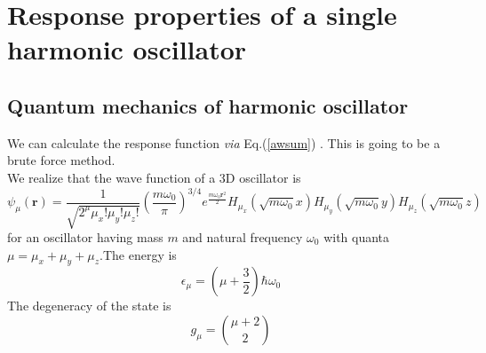 \documentclass{article}
\newcommand{\eq}{\begin{equation}}
\newcommand{\qe}{\end{equation}}
\newcommand{\lp}{\left(}
\newcommand{\rp}{\right)}
\newcommand{\rr}{\mathbf{r}}
\newcommand{\fact}[1]{#1!}
\newcommand{\eqnref}[1]{
Eq.(\ref{#1})
}
\newcommand{\via}{\emph{via }}
\begin{document}
\section{Response properties of a single harmonic oscillator}
 \subsection{Quantum mechanics of harmonic oscillator}
  We can calculate the response function \via \eqnref{awsum}. This is going to be a brute force method.\\
We realize that the wave function of a 3D oscillator is 
\eq\label{shof}
 \psi_{\mu}(\rr) = \frac{1}{\sqrt{2^{\mu}\fact{\mu_{x}}\fact{\mu_{y}}\fact{\mu_{z}}}}\lp\frac{m \omega_{0}}{\pi} \rp^{3/4}
e^{\frac{m \omega_{0}\rr^{2}}{2}}H_{\mu_{x}}(\sqrt{m \omega_{0}}x)H_{\mu_{y}}(\sqrt{m \omega_{0}}y)H_{\mu_{z}}(\sqrt{m \omega_{0}}z)
\qe
for an oscillator having mass $m$ and natural frequency $\omega_{0}$ with quanta $\mu = \mu_{x} + \mu_{y} + \mu_{z}$.The energy is 
\eq\label{3den}
 \epsilon_{\mu} = \left(\mu + \frac{3}{2}\right)\hbar \omega_{0}
\qe
The degeneracy of the state is 
\eq
 g_{\mu} = \binom{\mu+2}{2}
\qe
\end{document}
